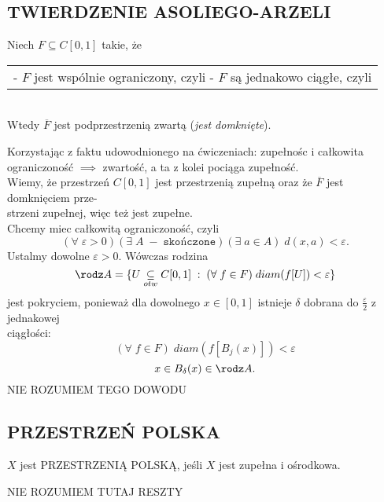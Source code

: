 \subsection{TWIERDZENIE ASOLIEGO-ARZELI}
\begin{center}\large
    Niech $F\subseteq C[0, 1]$ takie, że\smallskip\\
    \begin{tabular} { c }
        \makecell [l] {
            - $F$ jest wspólnie ograniczony, czyli\smallskip\\
            \indent{\normalsize$(\exists\;c>0) (\forall\;f\in F)(\forall\;x\in [0, 1])|f(x)|<c$}\smallskip\\
            - $F$ są jednakowo ciągłe, czyli\smallskip\\
            \indent{\normalsize$(\forall\;x)(\forall\;\varepsilon>0)(\exists\;\delta>0)(\forall\;f\in F)\;|x-y|<\delta\implies |f(x)-f(y)|<\varepsilon$} }
    \end{tabular}\medskip\\
    Wtedy $\overline F$ jest podprzestrzenią zwartą (\emph{jest domknięte}).
\end{center}
\dowod
Korzystając z faktu udowodnionego na ćwiczeniach: zupełnośc i całkowita ograniczoność $\implies$ zwartość, a ta z kolei pociąga zupełność.\bigskip\\
Wiemy, że przestrzeń $C[0, 1]$ jest przestrzenią zupełną oraz że $\overline F$ jest domknięciem prze-\\strzeni zupełnej, więc też jest zupełne.\smallskip\\
Chcemy miec całkowitą ograniczoność, czyli
$$(\forall\;\varepsilon>0)(\exists\;A\;-\;\texttt{skończone})(\exists\;a\in A)\;d(x, a)<\varepsilon.$$
Ustalmy dowolne $\varepsilon>0$. Wówczas rodzina
$$\rodz A=\{U\underset{otw}\subseteq C[0, 1]\;:\;(\forall\;f\in F)\;diam( f[U])<\varepsilon\}$$
jest pokryciem, ponieważ dla dowolnego $x\in [0, 1]$ istnieje $\delta$ dobrana do $\frac\varepsilon2$ z jednakowej \\ciągłości:
$$(\forall\;f\in F)\;diam(f[B_j(x)])<\varepsilon$$
$$x\in B_\delta(x)\in \rodz A.$$
{\color{cyan}NIE ROZUMIEM TEGO DOWODU}

\subsection{PRZESTRZEŃ POLSKA}
\begin{center}\large
    $X$ jest {\color{def}PRZESTRZENIĄ POLSKĄ}, jeśli $X$ jest {\color{acc}zupełna} i {\color{acc}ośrodkowa}.
\end{center}\bigskip
{\color{cyan}NIE ROZUMIEM TUTAJ RESZTY}\bigskip

